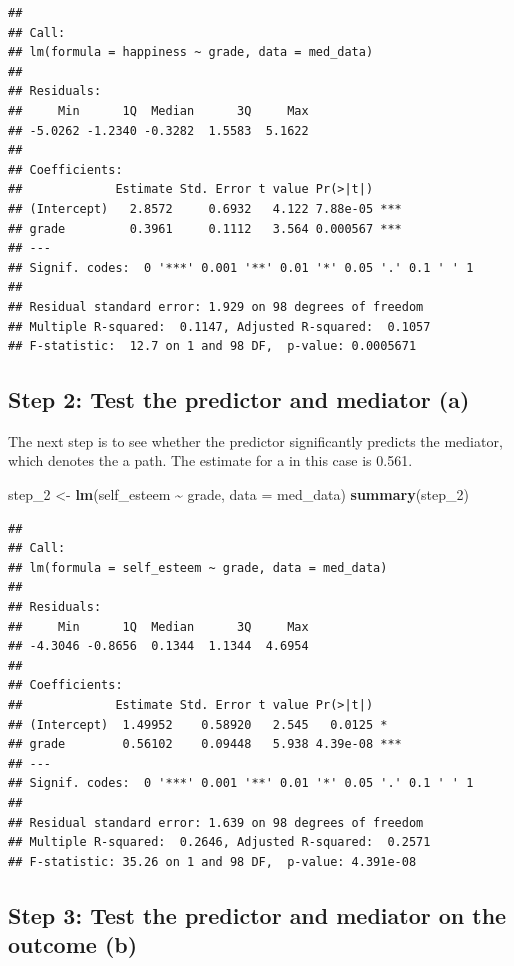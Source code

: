 \documentclass[
]{book}
\newenvironment{Shaded}{\begin{snugshade}}{\end{snugshade}}
\newcommand{\AttributeTok}[1]{\textcolor[rgb]{0.13,0.29,0.53}{#1}}
\newcommand{\FunctionTok}[1]{\textcolor[rgb]{0.13,0.29,0.53}{\textbf{#1}}}
\newcommand{\NormalTok}[1]{#1}
\newcommand{\OtherTok}[1]{\textcolor[rgb]{0.56,0.35,0.01}{#1}}
\newcommand{\SpecialCharTok}[1]{\textcolor[rgb]{0.81,0.36,0.00}{\textbf{#1}}}
\begin{document}
\begin{verbatim}
## 
## Call:
## lm(formula = happiness ~ grade, data = med_data)
## 
## Residuals:
##     Min      1Q  Median      3Q     Max 
## -5.0262 -1.2340 -0.3282  1.5583  5.1622 
## 
## Coefficients:
##             Estimate Std. Error t value Pr(>|t|)    
## (Intercept)   2.8572     0.6932   4.122 7.88e-05 ***
## grade         0.3961     0.1112   3.564 0.000567 ***
## ---
## Signif. codes:  0 '***' 0.001 '**' 0.01 '*' 0.05 '.' 0.1 ' ' 1
## 
## Residual standard error: 1.929 on 98 degrees of freedom
## Multiple R-squared:  0.1147, Adjusted R-squared:  0.1057 
## F-statistic:  12.7 on 1 and 98 DF,  p-value: 0.0005671
\end{verbatim}

\subsection{Step 2: Test the predictor and mediator (a)}\label{step-2-test-the-predictor-and-mediator-a}

The next step is to see whether the predictor significantly predicts the mediator, which denotes the a path. The estimate for a in this case is 0.561.

\begin{Shaded}
\begin{Highlighting}[]
\NormalTok{step\_2 }\OtherTok{\textless{}{-}} \FunctionTok{lm}\NormalTok{(self\_esteem }\SpecialCharTok{\textasciitilde{}}\NormalTok{ grade, }\AttributeTok{data =}\NormalTok{ med\_data)}
\FunctionTok{summary}\NormalTok{(step\_2)}
\end{Highlighting}
\end{Shaded}

\begin{verbatim}
## 
## Call:
## lm(formula = self_esteem ~ grade, data = med_data)
## 
## Residuals:
##     Min      1Q  Median      3Q     Max 
## -4.3046 -0.8656  0.1344  1.1344  4.6954 
## 
## Coefficients:
##             Estimate Std. Error t value Pr(>|t|)    
## (Intercept)  1.49952    0.58920   2.545   0.0125 *  
## grade        0.56102    0.09448   5.938 4.39e-08 ***
## ---
## Signif. codes:  0 '***' 0.001 '**' 0.01 '*' 0.05 '.' 0.1 ' ' 1
## 
## Residual standard error: 1.639 on 98 degrees of freedom
## Multiple R-squared:  0.2646, Adjusted R-squared:  0.2571 
## F-statistic: 35.26 on 1 and 98 DF,  p-value: 4.391e-08
\end{verbatim}

\subsection{Step 3: Test the predictor and mediator on the outcome (b)}\label{step-3-test-the-predictor-and-mediator-on-the-outcome-b}
\end{document}
